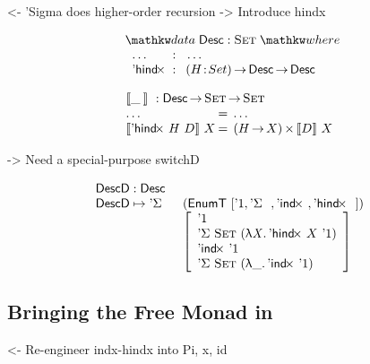 \documentclass[preprint, authoryear, onecolumn]{sigplanconf}
\newenvironment{structure}{\footnotesize\verbatim}{\endverbatim}
\begin{document}
\begin{structure}
<- 'Sigma does higher-order recursion
    -> Introduce hindx
\end{structure}

\[
\stk{
\data \Desc : \Set \where \\
\;\;\begin{array}{@{}l@{\::\:\:}l@{\quad}l}
    \ldots          & \:\:\ldots \\
    \DHindx         & \PI{H}{Set} \Desc \To \Desc
\end{array}
}
\]

\[\stk{
\descop{\_\:}{} : \Desc \To \Set \To \Set \\
\begin{array}{@{}l@{\:=\:\:}ll}
\ldots                        &  \ldots \\
\descop{\DHindx{H}{D}}{X}     &  \TIMES{(H \To X)}{\descop{D}{X}}
\end{array}
}\]

\begin{structure}
    -> Need a special-purpose switchD
\end{structure}


\[\stk{
\DescD : \Desc \\
\begin{array}{@{}ll}
\DescD \mapsto \DSigma{}{} & (\EnumT [ \DUnit, \DSigma{}{}, \DIndx{}, \DHindx{}{} ]) \\
                           & \left[\begin{array}{l}
                                   \DUnit                                \\
                                   \DSigma{\Set}{(\LAM{\V{X}} \DHindx{X}{\DUnit})} \\
                                   \DIndx{\DUnit}                                  \\
                                   \DSigma{\Set}{(\LAM{\_} \DIndx{\DUnit})}
                                   \end{array}
                             \right]
\end{array}
}
\]

\subsection{Bringing the Free Monad in}

\begin{structure}
<- Re-engineer indx-hindx into Pi, x, id
\end{structure}
\end{document}
